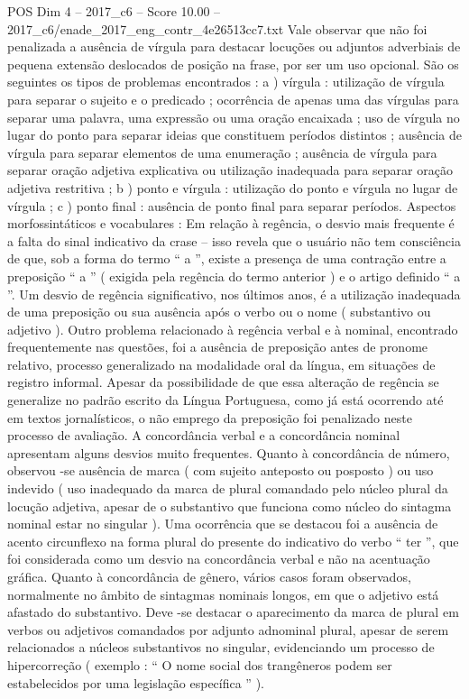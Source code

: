 \begin{textsample}{POS Dim 4 – 2017\_c6 – Score 10.00 – 2017\_c6/enade\_2017\_eng\_contr\_4e26513cc7.txt}
Vale observar que não foi penalizada a ausência de vírgula para destacar locuções ou adjuntos adverbiais de pequena extensão deslocados de posição na frase, por ser um uso opcional.
São os seguintes os tipos de problemas encontrados : a ) vírgula : utilização de vírgula para separar o sujeito e o predicado ; ocorrência de apenas uma das vírgulas para separar uma palavra, uma expressão ou uma oração encaixada ; uso de vírgula no lugar do ponto para separar ideias que constituem períodos distintos ; ausência de vírgula para separar elementos de uma enumeração ; ausência de vírgula para separar oração adjetiva explicativa ou utilização inadequada para separar oração adjetiva restritiva ; b ) ponto e vírgula : utilização do ponto e vírgula no lugar de vírgula ; c ) ponto final : ausência de ponto final para separar períodos.
Aspectos morfossintáticos e vocabulares : Em relação à regência, o desvio mais frequente é a falta do sinal indicativo da crase – isso revela que o usuário não tem consciência de que, sob a forma do termo “ a ”, existe a presença de uma contração entre a preposição “ a ” ( exigida pela regência do termo anterior ) e o artigo definido “ a ”.
Um desvio de regência significativo, nos últimos anos, é a utilização inadequada de uma preposição ou sua ausência após o verbo ou o nome ( substantivo ou adjetivo ).
Outro problema relacionado à regência verbal e à nominal, encontrado frequentemente nas questões, foi a ausência de preposição antes de pronome relativo, processo generalizado na modalidade oral da língua, em situações de registro informal.
Apesar da possibilidade de que essa alteração de regência se generalize no padrão escrito da Língua Portuguesa, como já está ocorrendo até em textos jornalísticos, o não emprego da preposição foi penalizado neste processo de avaliação.
A concordância verbal e a concordância nominal apresentam alguns desvios muito frequentes.
Quanto à concordância de número, observou -se ausência de marca ( com sujeito anteposto ou posposto ) ou uso indevido ( uso inadequado da marca de plural comandado pelo núcleo plural da locução adjetiva, apesar de o substantivo que funciona como núcleo do sintagma nominal estar no singular ).
Uma ocorrência que se destacou foi a ausência de acento circunflexo na forma plural do presente do indicativo do verbo “ ter ”, que foi considerada como um desvio na concordância verbal e não na acentuação gráfica.
Quanto à concordância de gênero, vários casos foram observados, normalmente no âmbito de sintagmas nominais longos, em que o adjetivo está afastado do substantivo.
Deve -se destacar o aparecimento da marca de plural em verbos ou adjetivos comandados por adjunto adnominal plural, apesar de serem relacionados a núcleos substantivos no singular, evidenciando um processo de hipercorreção ( exemplo : “ O nome social dos trangêneros podem ser estabelecidos por uma legislação específica ” ).

\end{textsample}
